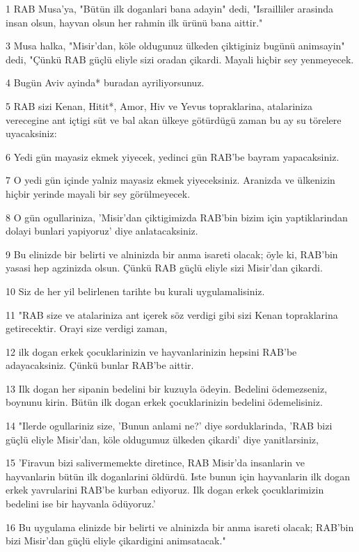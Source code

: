 \par 1 RAB Musa'ya, "Bütün ilk doganlari bana adayin" dedi, "Israilliler arasinda insan olsun, hayvan olsun her rahmin ilk ürünü bana aittir."
\par 3 Musa halka, "Misir'dan, köle oldugunuz ülkeden çiktiginiz bugünü animsayin" dedi, "Çünkü RAB güçlü eliyle sizi oradan çikardi. Mayali hiçbir sey yenmeyecek.
\par 4 Bugün Aviv ayinda* buradan ayriliyorsunuz.
\par 5 RAB sizi Kenan, Hitit*, Amor, Hiv ve Yevus topraklarina, atalariniza verecegine ant içtigi süt ve bal akan ülkeye götürdügü zaman bu ay su törelere uyacaksiniz:
\par 6 Yedi gün mayasiz ekmek yiyecek, yedinci gün RAB'be bayram yapacaksiniz.
\par 7 O yedi gün içinde yalniz mayasiz ekmek yiyeceksiniz. Aranizda ve ülkenizin hiçbir yerinde mayali bir sey görülmeyecek.
\par 8 O gün ogullariniza, 'Misir'dan çiktigimizda RAB'bin bizim için yaptiklarindan dolayi bunlari yapiyoruz' diye anlatacaksiniz.
\par 9 Bu elinizde bir belirti ve alninizda bir anma isareti olacak; öyle ki, RAB'bin yasasi hep agzinizda olsun. Çünkü RAB güçlü eliyle sizi Misir'dan çikardi.
\par 10 Siz de her yil belirlenen tarihte bu kurali uygulamalisiniz.
\par 11 "RAB size ve atalariniza ant içerek söz verdigi gibi sizi Kenan topraklarina getirecektir. Orayi size verdigi zaman,
\par 12 ilk dogan erkek çocuklarinizin ve hayvanlarinizin hepsini RAB'be adayacaksiniz. Çünkü bunlar RAB'be aittir.
\par 13 Ilk dogan her sipanin bedelini bir kuzuyla ödeyin. Bedelini ödemezseniz, boynunu kirin. Bütün ilk dogan erkek çocuklarinizin bedelini ödemelisiniz.
\par 14 "Ilerde ogullariniz size, 'Bunun anlami ne?' diye sorduklarinda, 'RAB bizi güçlü eliyle Misir'dan, köle oldugumuz ülkeden çikardi' diye yanitlarsiniz,
\par 15 'Firavun bizi salivermemekte diretince, RAB Misir'da insanlarin ve hayvanlarin bütün ilk doganlarini öldürdü. Iste bunun için hayvanlarin ilk dogan erkek yavrularini RAB'be kurban ediyoruz. Ilk dogan erkek çocuklarimizin bedelini ise bir hayvanla ödüyoruz.'
\par 16 Bu uygulama elinizde bir belirti ve alninizda bir anma isareti olacak; RAB'bin bizi Misir'dan güçlü eliyle çikardigini animsatacak."
